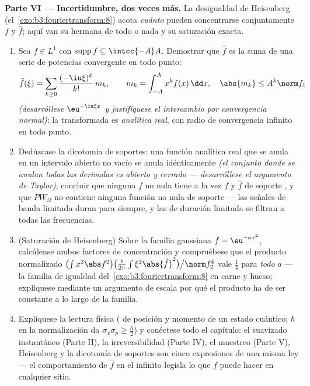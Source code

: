 \begin{problem}[{Problema de fin de semana --- $\partial_tu =
\partial^2_{xx}u$, resuelta de principio a fin}]
\medskip
\noindent\textbf{Parte VI --- Incertidumbre, dos veces más.} La
desigualdad de Heisenberg (el~\cref{exo:b3:fouriertransform:8}) acota
\emph{cuánto} pueden concentrarse conjuntamente $f$ y $\hat f$; aquí van
su hermana de todo o nada y su saturación exacta.
\begin{enumerate}[resume]
  \item Sea $f \in L^1$ con $\operatorname{supp}f \subseteq
        \intcc{-A}A$. Demostrar que $\hat f$ es la suma de una serie de
  potencias convergente en todo punto:
        \[
        \hat f(\xi) = \sum_{k\geq0}\frac{(-\iu\xi)^k}{k!}
        \,m_k, \qquad m_k = \int_{-A}^{A}x^kf(x)\,\dd x,
        \quad \abs{m_k} \leq A^k\norm f_1
        \]
        \emph{(desarróllese $\eu^{-\iu\xi x}$ y justifíquese el
        intercambio por convergencia normal)}: la transformada es
        \emph{analítica real}, con radio de convergencia infinito en
        todo punto. \item Dedúzcase la dicotomía de soportes: una
        función analítica real que se anula en un intervalo abierto no
        vacío se anula idénticamente \emph{(el conjunto donde se anulan
        todas las derivadas es abierto y cerrado --- desarróllese el
        argumento de Taylor)}; concluir que ninguna $f$ no nula tiene a
        la vez $f$ y $\hat f$ de soporte , y que $PW_\Omega$ no
        contiene ninguna función no nula de soporte  --- las
        señales de banda limitada duran para siempre, y las de duración
        limitada se filtran a todas las frecuencias. \item (Saturación
        de Heisenberg) Sobre la familia gaussiana $f
        = \eu^{-ax^2}$, calcúlense ambos factores de concentración y
        compruébese que el producto normalizado
        $\bigl(\int x^2\abs f^2\bigr)\bigl(\frac1{2\pi}\int
        \xi^2\abs{\hat f}^2\bigr)\big/\norm f_2^4$ vale $\frac14$ para
        \emph{todo} $a$ --- la familia de igualdad
        del~\cref{exo:b3:fouriertransform:8} en carne y hueso;
        explíquese mediante un argumento de escala por qué el producto
        ha de ser constante a lo largo de la familia. \item Explíquese
        la lectura física ( de posición y momento de un estado
        cuántico; $\hbar$ en la normalización da $\sigma_x\sigma_p \geq
        \frac\hbar2$) y conéctese todo el capítulo: el suavizado
        instantáneo (Parte II), la irreversibilidad (Parte IV), el
        muestreo (Parte V), Heisenberg y la dicotomía de soportes son
        cinco expresiones de una misma ley --- el comportamiento de
        $\hat f$ en el infinito legisla lo que $f$ puede hacer en
        cualquier sitio.
\end{enumerate}


\end{problem}
